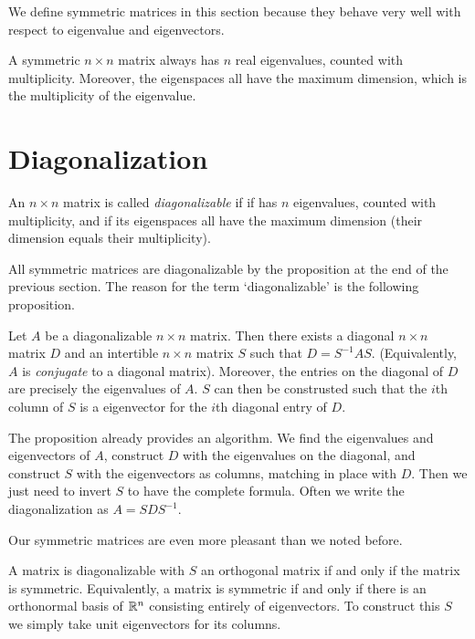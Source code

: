 \documentclass[fleqn]{report}
\begin{document}
We define symmetric matrices in this section because they
behave very well with respect to eigenvalue and eigenvectors.

\begin{prop}
A symmetric $n \times n$ matrix always has $n$ real eigenvalues,
counted with multiplicity. Moreover, the eigenspaces all have
the maximum dimension, which is the multiplicity of the
eigenvalue.
\end{prop}

\chapter{Diagonalization}

\begin{defn}
An $n \times n$ matrix is called \emph{diagonalizable} if if
has $n$ eigenvalues, counted with multiplicity, and if its
eigenspaces all have the maximum dimension (their dimension
equals their multiplicity).
\end{defn}

All symmetric matrices are diagonalizable by the
proposition at the end of the previous section. The reason
for the term `diagonalizable' is the following proposition.

\begin{prop}
Let $A$ be a diagonalizable $n \times n$ matrix. Then there
exists a diagonal $n \times n$ matrix $D$ and an intertible $n
\times n$ matrix $S$ such that $D = S^{-1}AS$. (Equivalently,
$A$ is \emph{conjugate} to a diagonal matrix). Moreover, the
entries on the diagonal of $D$ are precisely the eigenvalues
of $A$. $S$ can then be construsted such that the $i$th column
of $S$ is a eigenvector for the $i$th diagonal entry of $D$.
\end{prop}

The proposition already provides an algorithm. We find the
eigenvalues and eigenvectors of $A$, construct $D$ with the
eigenvalues on the diagonal, and construct $S$ with the
eigenvectors as columns, matching in place with $D$. Then we
just need to invert $S$ to have the complete formula. Often
we write the diagonalization as $A = SDS^{-1}$. 

Our symmetric matrices are even more pleasant than we noted
before.

\begin{prop}
A matrix is diagonalizable with $S$ an orthogonal matrix if
and only if the matrix is symmetric. Equivalently, a matrix
is symmetric if and only if there is an orthonormal basis of
$\mathbb{R}^n$ consisting entirely of eigenvectors. To construct
this $S$ we simply take unit eigenvectors for its columns.
\end{prop}
\end{document}

